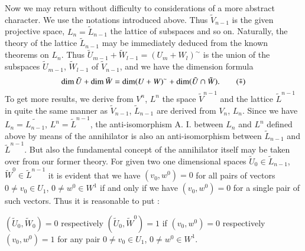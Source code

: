 Now we may return without difficulty to considerations of a more
abstract character. We use the notations introduced above. Thus
$\tilde{V}_{n-1}$ is the given projective space, $L_{n} =
\tilde{L}_{n-1}$ the lattice of subspaces and so on. Naturally, the
theory of the lattice $\tilde{L}_{n-1}$ may be immediately deduced
from the known theorems on $L_n$. Thus $\tilde{U}_{m-1} +
\tilde{W}_{l-1} = (U_m + W_l)^\sim$ is the union of the subspaces
$\tilde{U}_{m-1}$, $\tilde{W}_{l-1}$ of $\tilde{V}_{n-1}$, and we have
the dimension formula
\begin{equation*}
\dim\tilde{U} + \dim \tilde{W} = \dim (U + W)^\sim + \dim (\tilde{U}
\cap \tilde{W}). \tag{$\tilde{\ast}$}
\end{equation*}\pageoriginale
To get more results, we derive from $V^n$, $L^n$ the space
$\tilde{V}^{n-1}$ and the lattice $\tilde{L}^{n-1}$ in quite the same
manner as $\tilde{V}_{n-1}$, $\tilde{L}_{n-1}$ are derived from $V_n$,
$L_n$. Since we have $L_n = \tilde{L_{n-1}}$, $L^n = \tilde{L}^{n-1}$,
the anti-isomorphism A. I. between $L_n$ and $L^n$ defined above by
means of the annihilator is also an anti-isomorphism between
$\tilde{L}_{n-1}$ and $\tilde{L}^{n-1}$. But also the fundamental
concept of the annihilator itself may be taken over from our former
theory. For given two one dimensional spaces $\tilde{U}_0 \in
\tilde{L}_{n-1}$, $\tilde{W}^0 \in \tilde{L}^{n-1}$ it is evident that
we have $(v_0, w^0) = 0$  for all pairs of vectors $0 \neq v_0 \in
U_1$, $0 \neq w^0 \in W^1$ if and only if we have $(v_0, w^0) = 0$ for
a single pair of such vectors. Thus it is reasonable to put :

$(\tilde{U}_0, \tilde{W}_0) = 0$ respectively $(\tilde{U}_0,
\tilde{W}^0) = 1$  if $(v_0, w^0) =0$ respectively $(v_0, w^0) =1$ for
any pair $0 \neq v_0 \in U_1$, $0 \neq w^0 \in W^1$.

